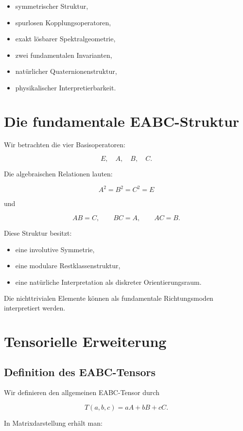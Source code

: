\documentclass[11pt,a4paper]{article}
\theoremstyle{definition}
\begin{document}
	\begin{itemize}
		\item symmetrischer Struktur,
		\item spurlosen Kopplungsoperatoren,
		\item exakt lösbarer Spektralgeometrie,
		\item zwei fundamentalen Invarianten,
		\item natürlicher Quaternionenstruktur,
		\item physikalischer Interpretierbarkeit.
	\end{itemize}
	
	\section{Die fundamentale EABC-Struktur}
	
	Wir betrachten die vier Basisoperatoren:
	
	\[
	E,\quad A,\quad B,\quad C.
	\]
	
	Die algebraischen Relationen lauten:
	
	\[
	A^2=B^2=C^2=E
	\]
	
	und
	
	\[
	AB=C,\qquad BC=A,\qquad AC=B.
	\]
	
	Diese Struktur besitzt:
	
	\begin{itemize}
		\item eine involutive Symmetrie,
		\item eine modulare Restklassenstruktur,
		\item eine natürliche Interpretation als diskreter Orientierungsraum.
	\end{itemize}
	
	Die nichttrivialen Elemente können als fundamentale Richtungsmoden interpretiert werden.
	
	\section{Tensorielle Erweiterung}
	
	\subsection{Definition des EABC-Tensors}
	
	Wir definieren den allgemeinen EABC-Tensor durch
	
	\[
	T(a,b,c)=aA+bB+cC.
	\]
	
	In Matrixdarstellung erhält man:
	
\end{document}
